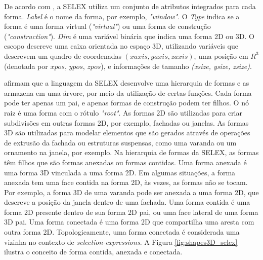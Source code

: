 \begin{figure}[h!]
	\centering
	\captionsetup{width=15cm}
	{}	
\end{figure}

De acordo com , a \gls{SELEX} utiliza um conjunto de atributos integrados para cada forma. \textit{Label} é o nome da forma, por exemplo, \textit{"window"}. O \textit{Type} indica se a forma é uma forma virtual (\textit{"virtual"}) ou uma forma de construção (\textit{"construction"}). \textit{Dim} é uma variável binária que indica uma forma 2D ou 3D. O escopo descreve uma caixa orientada no espaço 3D, utilizando variáveis que descrevem um quadro de coordenadas $(xaxis, yaxis, zaxis)$, uma posição em $R^3$ (denotada por $xpos$, $ypos$, $zpos$), e informações de tamanho \textit{(xsize, ysize, zsize)}.

 afirmam que a linguagem da \gls{SELEX} desenvolve uma hierarquia de formas e as armazena em uma árvore, por meio da utilização de certas funções. Cada forma pode ter apenas um pai, e apenas formas de construção podem ter filhos. O nó raiz é uma forma com o rótulo \textit{"root"}. As formas 2D são utilizadas para criar subdivisões em outras formas 2D, por exemplo, fachadas ou janelas. As formas 3D são utilizadas para modelar elementos que são gerados através de operações de extrusão da fachada ou estruturas suspensas, como uma varanda ou um ornamento na janela, por exemplo. Na hierarquia de formas da \gls{SELEX}, as formas têm filhos que são formas anexadas ou formas contidas. Uma forma anexada é uma forma 3D vinculada a uma forma 2D. Em algumas situações, a forma anexada tem uma face contida na forma 2D, às vezes, as formas não se tocam. Por exemplo, a forma 3D de uma varanda pode ser anexada a uma forma 2D, que descreve a posição da janela dentro de uma fachada. Uma forma contida é uma forma 2D presente dentro de sua forma 2D pai, ou uma face lateral de uma forma 3D pai. Uma forma conectada é uma forma 2D que compartilha uma aresta com outra forma 2D. Topologicamente, uma forma conectada é considerada uma vizinha no contexto de \textit{selection-expressions}. A Figura \ref{fig:shapes3D_selex} ilustra o conceito de forma contida, anexada e conectada.

